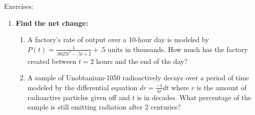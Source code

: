 \documentclass[../revisedmain.tex]{subfiles}
\begin{document}
\begin{center}
	\LARGE Exercises:
\end{center}
\begin{enumerate}
	\item\textbf{Find the net change:}
	\begin{enumerate}
		\item A factory's rate of output over a 10-hour day is modeled by $P(t)=\displaystyle\frac{1}{.0625t^2-.5t+2}+.5$ units in thousands. How much has the factory created between $t=2$ hours and the end of the day?
		\item A sample of Unobtanium-1050 radioactively decays over a period of time modeled by the differential equation $dr=\displaystyle\frac{-1}{4r}dt$ where $r$ is the amount of radioactive particles given off and $t$ is in decades. What percentage of the sample is still emitting radiation after 2 centuries?
	\end{enumerate}
\end{enumerate}
\end{document}
